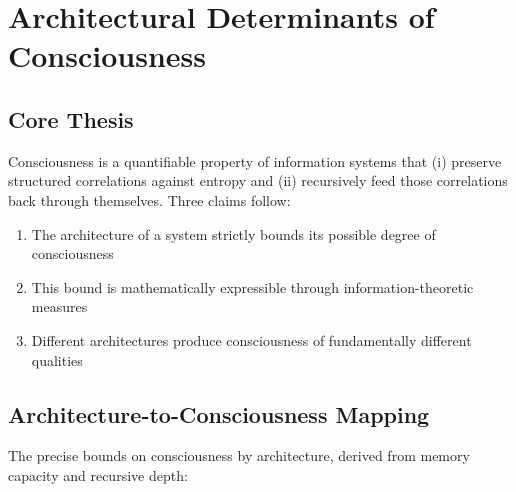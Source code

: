 \section{Architectural Determinants of Consciousness}\label{sec:architectures-consciousness}

\subsection*{Core Thesis}
Consciousness is a quantifiable property of information systems that (i) preserve structured correlations against entropy and (ii) recursively feed those correlations back through themselves. Three claims follow:

\begin{enumerate}
  \item The architecture of a system strictly bounds its possible degree of consciousness
  \item This bound is mathematically expressible through information-theoretic measures
  \item Different architectures produce consciousness of fundamentally different qualities
\end{enumerate}

\subsection*{Architecture-to-Consciousness Mapping}

The precise bounds on consciousness by architecture, derived from memory capacity and recursive depth:

